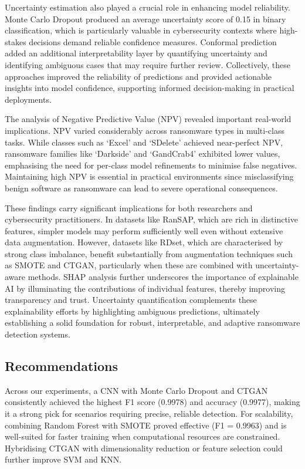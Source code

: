 Uncertainty estimation also played a crucial role in enhancing model reliability. Monte Carlo Dropout produced an average uncertainty score of 0.15 in binary classification, which is particularly valuable in cybersecurity contexts where high-stakes decisions demand reliable confidence measures. Conformal prediction added an additional interpretability layer by quantifying uncertainty and identifying ambiguous cases that may require further review. Collectively, these approaches improved the reliability of predictions and provided actionable insights into model confidence, supporting informed decision-making in practical deployments.

The analysis of Negative Predictive Value (NPV) revealed important real-world implications. NPV varied considerably across ransomware types in multi-class tasks. While classes such as ‘Excel’ and ‘SDelete’ achieved near-perfect NPV, ransomware families like ‘Darkside’ and ‘GandCrab4’ exhibited lower values, emphasising the need for per-class model refinements to minimise false negatives. Maintaining high NPV is essential in practical environments since misclassifying benign software as ransomware can lead to severe operational consequences.

These findings carry significant implications for both researchers and cybersecurity practitioners. In datasets like RanSAP, which are rich in distinctive features, simpler models may perform sufficiently well even without extensive data augmentation. However, datasets like RDset, which are characterised by strong class imbalance, benefit substantially from augmentation techniques such as SMOTE and CTGAN, particularly when these are combined with uncertainty-aware methods. SHAP analysis further underscores the importance of explainable AI by illuminating the contributions of individual features, thereby improving transparency and trust. Uncertainty quantification complements these explainability efforts by highlighting ambiguous predictions, ultimately establishing a solid foundation for robust, interpretable, and adaptive ransomware detection systems.

\subsection{Recommendations}

Across our experiments, a CNN with Monte Carlo Dropout and CTGAN consistently achieved the highest F1 score (0.9978) and accuracy (0.9977), making it a strong pick for scenarios requiring precise, reliable detection. For scalability, combining Random Forest with SMOTE proved effective (F1 = 0.9963) and is well-suited for faster training when computational resources are constrained. Hybridising CTGAN with dimensionality reduction or feature selection could further improve SVM and KNN.

